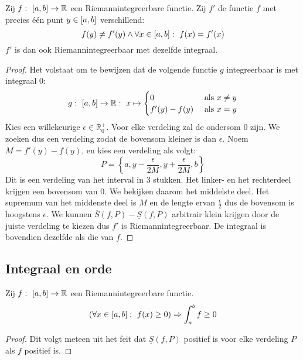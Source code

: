 \documentclass[main.tex]{subfiles}
\begin{document}
\begin{st}
  Zij $f:\ \interval{a}{b} \rightarrow \mathbb{R}$ een Riemannintegreerbare functie.
  Zij $f'$ de functie $f$ met precies \'e\'en punt $y\in\interval{a}{b}$ verschillend:
  \[ f(y) \neq f'(y) \wedge \forall x\in \interval{a}{b}:\ f(x) = f'(x) \]
  $f'$ is dan ook Riemannintegreerbaar met dezelfde integraal.

  \begin{proof}
    Het volstaat om te bewijzen dat de volgende functie $g$ integreerbaar is met integraal $0$:
    \[
    g:\ \interval{a}{b} \rightarrow \mathbb{R}:\ x \mapsto
    \begin{cases}
      0 &\text{ als } x \neq y\\
      f'(y)-f(y) &\text{ als } x = y
    \end{cases}
    \]
    Kies een willekeurige $\epsilon\in\mathbb{R}_{0}^{+}$.
    Voor elke verdeling zal de ondersom $0$ zijn.
    We zoeken dus een verdeling zodat de bovensom kleiner is dan $\epsilon$.
    Noem $M = f'(y) - f(y)$, en kies een verdeling als volgt:
    \[ P = \left\{ a, y-\frac{\epsilon}{2M}, y+\frac{\epsilon}{2M}, b\right\} \]
    Dit is een verdeling van het interval in $3$ stukken.
    Het linker- en het rechterdeel krijgen een bovensom van $0$.
    We bekijken daarom het middelste deel.
    Het supremum van het middenste deel is $M$ en de lengte ervan $\frac{\epsilon}{2}$ dus de bovensom is hoogstens $\epsilon$.
    We kunnen $\overline{S}(f,P) - \underline{S}(f,P)$ arbitrair klein krijgen door de juiste verdeling te kiezen dus $f'$ is Riemannintegreerbaar.
    De integraal is bovendien dezelfde als die van $f$.
  \end{proof}
\end{st}


\subsection{Integraal en orde}
\label{sec:integraal-en-orde}

\begin{bpr}
  \label{pr:integraal-behoudt-orde-1}
  Zij $f:\ \interval{a}{b} \rightarrow \mathbb{R}$ een Riemannintegreerbare functie.
  \[ \left( \forall x\in \interval{a}{b}:\ f(x) \ge 0 \right) \Rightarrow \int_{a}^{b} f \ge 0 \]

  \begin{proof}
    Dit volgt meteen uit het feit dat $\underline{S}(f,P)$ positief is voor elke verdeling $P$ als $f$ positief is.
  \end{proof}
\end{bpr}
\end{document}
